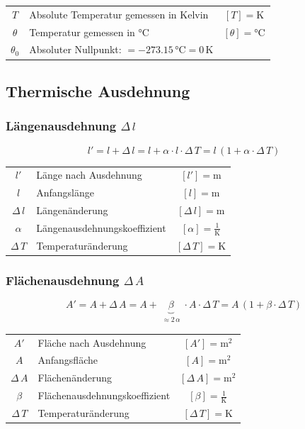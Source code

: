 \begin{tabular}{c l c}
		$T$ & Absolute Temperatur gemessen in Kelvin & $[T] =\mathrm{K}$  \\
		$\theta$ & Temperatur gemessen in °C & $[\theta] = \text{°C}$ \\
		$\theta_0$ & Absoluter Nullpunkt: $= -273.15 \,  \text{°C} = 0 \, \mathrm{K}$  &  \\
\end{tabular}




\subsection{Thermische Ausdehnung}

\subsubsection{Längenausdehnung $\Delta \, l $}

$$ \boxed{  l' = l + \Delta \,  l = l + \alpha \cdot l \cdot \Delta \, T = l\, (1 + \alpha \cdot \Delta \, T ) }$$


\begin{tabular}{c l c}
		$l'$ & Länge nach Ausdehnung & $[l'] = \mathrm{m}$ \\
		$l$ & Anfangslänge & $[l] = \mathrm{m}$ \\
		$\Delta \, l$ & Längenänderung & $[\Delta \, l] = \mathrm{m}$ \\
		\rule{0pt}{8pt}$\alpha$ & Längenausdehnungskoeffizient & $[\alpha] = \mathrm{\frac{1}{K}}$ \\ 
		$\Delta \, T $ & Temperaturänderung & $[\Delta \, T ] = \mathrm{K}$ \\
\end{tabular}


\subsubsection{Flächenausdehnung $\Delta \, A $}

$$ \boxed{ A' = A + \Delta \,  A = A + \underbrace{  \beta }_{\substack{\approx 2 \, \alpha}}  \cdot A \cdot \Delta \, T = A\, (1 + \beta \cdot \Delta \, T ) } $$


\begin{tabular}{c l c}
		$A'$ & Fläche nach Ausdehnung & $[A'] = \mathrm{m^2}$ \\
		$A$ & Anfangsfläche & $[A] = \mathrm{m^2}$ \\
		$\Delta \, A$ & Flächenänderung & $[\Delta \, A] = \mathrm{m^2}$ \\
		\rule{0pt}{8pt}$\beta$ & Flächenausdehnungskoeffizient & $[\beta] = \mathrm{\frac{1}{K}}$ \\ 
		$\Delta \, T $ & Temperaturänderung & $[\Delta \, T ] = \mathrm{K}$ \\
\end{tabular}



